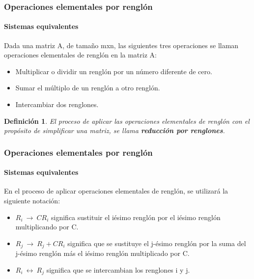 \documentclass[11pt]{beamer}
\newtheorem{defi}{Definición}
\begin{document}
\begin{frame}
\frametitle{Operaciones elementales por renglón}
\framesubtitle{Sistemas equivalentes}
Dada una matriz A, de tamaño mxn, las siguientes tres operaciones se llaman operaciones elementales de renglón en la matriz A:\\
\begin{itemize}
\item Multiplicar o dividir un renglón por un número diferente de cero.
\item Sumar el múltiplo de un renglón a otro renglón.
\item Intercambiar dos renglones.
\end{itemize}
\begin{defi}
El proceso de aplicar las operaciones elementales de renglón con el propósito de simplificar una matriz, se  llama \textbf{reducción por renglones}.
\end{defi}
\end{frame}

\begin{frame}
\frametitle{Operaciones elementales por renglón}
\framesubtitle{Sistemas equivalentes}
En el proceso de aplicar operaciones elementales de renglón, se utilizará la siguiente notación: \\
\begin{itemize}
\item $R_i~\rightarrow~CR_i$ significa sustituir el iésimo renglón  por el iésimo renglón multiplicando por C.
\item $R_j~\rightarrow~R_j + CR_i$ significa que se sustituye el j-ésimo renglón por la suma del j-ésimo renglón más el iésimo renglón multiplicado por C.
\item $R_i~\leftrightarrow~R_j $ significa que se intercambian los renglones i y j.
\end{itemize}
\end{frame}
\end{document}
